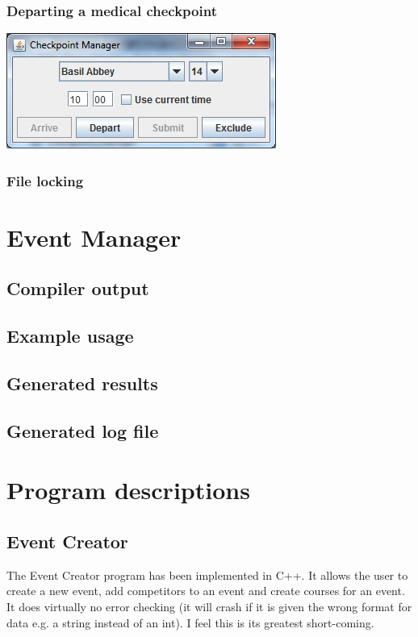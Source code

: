 \documentclass[a4paper, twoside]{article}
\begin{document}
\subsubsection{Departing a medical checkpoint}
\includegraphics{screenshot3.jpg}
\subsubsection{File locking}

\section{Event Manager}
\subsection{Compiler output}

\subsection{Example usage}
\subsection{Generated results}
\subsection{Generated log file}

\section{Program descriptions}
\subsection{Event Creator}
The Event Creator program has been implemented in C++. It allows the user to
create a new event, add competitors to an event and create courses for an event.
It does virtually no error checking (it will crash if it is given the wrong
format for data e.g. a string instead of an int). I feel this is its greatest
short-coming.
\end{document}
